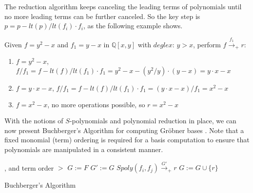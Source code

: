 The reduction algorithm keeps canceling the leading terms of polynomials 
until no more leading terms can be further canceled.
So the key step is $p=p-lt(p)/lt(f_{i}) \cdot f_{i}$, as the following 
example shows.
\begin{Example}
Given $f = y^{2}-x$ and $f_{1} = y - x$ in $\mathbb{Q}[x,y]$ with $deglex$: 
$y>x$, perform $f\stackrel{f_1}{\textstyle\longrightarrow}_+r$:

\begin{enumerate}
\item $f=y^{2}-x$, $f/f_{1}=f-lt(f)/lt(f_{1}) \cdot f_{1}=y^{2}-x-(y^{2} /y) \cdot (y-x)=y\cdot x-x$
\item $f=y\cdot x-x$, $f/f_{1}=f-lt(f)/lt(f_{1}) \cdot f_{1}=(y\cdot x-x)/f_{1}=x^{2}-x$
\item $f=x^{2}-x$, no more operations possible, so $r=x^{2}-x$
\end{enumerate}
\end{Example}

With the notions of $S$-polynomials and polynomial reduction in place,
we can now present Buchberger's Algorithm 
for computing Gr\"obner bases \cite{buchberger_thesis}. Note that a fixed 
monomial (term) ordering is required for a \Grobner basis 
computation to ensure that polynomials are manipulated in a consistent 
manner.

\begin{algorithm}[H]
\SetAlgoNoLine
 , and term order $>$
  $G:= F$\;
  {
  	$G' := G$\;
	{
		$Spoly(f_{i}, f_{j}) \stackrel{G'}{\textstyle\longrightarrow}_+r$ \;
		{
			$G:= G \cup \{r\}$ \;
		}
	}
   }
\caption {Buchberger's Algorithm}\label{alg:gb}
\end{algorithm}

